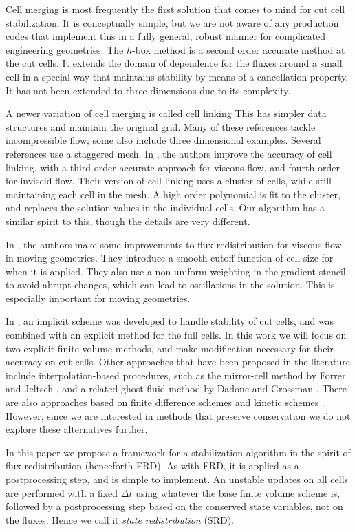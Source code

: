 Cell merging is most frequently the first solution that comes to mind for cut cell stabilization. It is conceptually simple, but 
we are not aware of any production codes that implement this in a fully
general, robust manner for complicated engineering geometries. 
The $h$-box method \cite{mjb-hel-rjl:hbox2,mjb-hel:hboxsimple}
is a second order accurate method at the cut cells. It extends the 
domain of dependence for the fluxes around a small cell in a 
special way that maintains stability by means of a cancellation
property. It  has not been extended to
three dimensions due to its complexity. 

A newer variation of cell merging is called cell linking \cite{cecereGiacomazzi,
KirkpatrickEtAl:2003, HuKhooAdamsHuang:2006,Chung:2006} 
This has simpler data structures and maintain the original grid. 
Many of these references tackle incompressible flow; some also include
three dimensional examples. Several references use a staggered mesh. 
In \cite{BalajiMenon:2016}, the authors improve the accuracy of cell linking,
with a third order accurate approach for viscous flow,  and fourth order for 
inviscid flow. 
Their version of cell linking uses a cluster of cells,
while still maintaining each cell in the mesh.  A high order
polynomial is fit to the cluster, and replaces the solution values in the
individual cells.  Our algorithm has a similar spirit to this, though the
details are very different. 

In \cite{shws:2011}, the authors make
some improvements to flux redistribution for viscous flow in moving
geometries. They introduce a
smooth cutoff function of cell size for when it is applied. They also
use a non-uniform weighting in the gradient stencil to avoid abrupt
changes, which can lead to oscillations in the solution. This is
especially important for moving geometries.

In \cite{May-Berger:JSC}, an implicit scheme was developed to
handle stability of cut cells, and was combined with an 
explicit method for the full cells. In this work we will focus on 
two explicit finite volume methods, and make modification necessary for their accuracy 
on cut cells.
Other approaches that have been proposed in the literature include
interpolation-based procedures, such as the mirror-cell method by Forrer
and Jeltsch \cite{article:FoJe98}, and a related ghost-fluid method by
Dadone and Grossman \cite{DadoneGrossman}.
There are also approaches based on finite difference schemes
\cite{SjogreenPetersson,MarcoBjorn}
and kinetic schemes \cite{Oksuzoglu:thesis,KeenKarni}.
However, since we are interested in methods
that preserve conservation we do not explore these alternatives further.

In this paper we propose a framework for a stabilization algorithm in
the spirit of flux redistribution (henceforth FRD). 
As with FRD, it is applied as a postprocessing
step, and is simple to implement. 
An unstable updates on all cells are performed
with a fixed $\Delta t$ using whatever the base finite volume scheme is, followed by a 
postprocessing step based on the
conserved state variables, not on the fluxes.
Hence we call it {\em state redistribution} (SRD).



